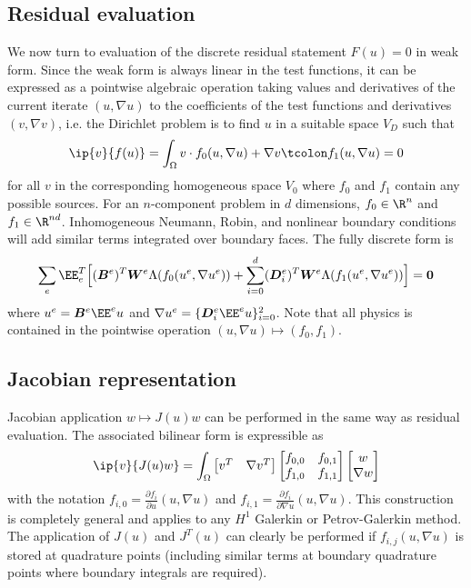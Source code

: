 \subsection{Residual evaluation}\label{sec:res-eval}
We now turn to evaluation of the discrete residual statement $F(u) = 0$ in weak form.  Since the weak form is always
linear in the test functions, it can be expressed as a pointwise algebraic operation taking values and derivatives of
the current iterate $(u,\nabla u)$ to the coefficients of the test functions and derivatives $(v,\nabla v)$, i.e. the
Dirichlet problem is to find $u$ in a suitable space $V_D$ such that
\begin{equation}\label{eq:feval}
  \ip{v}{f(u)} = \int_\Omega v \cdot f_0(u,\nabla u) + \nabla v \tcolon f_1(u,\nabla u) = 0
\end{equation}
for all $v$ in the corresponding homogeneous space $V_0$ where $f_0$ and $f_1$ contain any possible sources.  For an
$n$-component problem in $d$ dimensions, $f_0 \in \R^n$ and $f_1 \in \R^{nd}$.  Inhomogeneous Neumann, Robin, and
nonlinear boundary conditions will add similar terms integrated over boundary faces.  The fully discrete form is
\begin{equation}
  \label{eq:sum}
  \sum_e \EE_e^T \Big[ (\bm B^e)^T \bm W^e \Lambda(f_0(u^e,\nabla u^e))
  + \sum_{i=0}^d(\bm D_i^e)^T \bm W^e \Lambda(f_1(u^e,\nabla u^e)) \Big] = \bm 0
\end{equation}
where $u^e = \bm B^e \EE^e u$ and $\nabla u^e = \{\bm D_i^e \EE^e u\}_{i=0}^2$.  Note that all physics is contained in
the pointwise operation $(u,\nabla u) \mapsto (f_0,f_1)$.

\subsection{Jacobian representation}\label{sec:jac-rep}
Jacobian application $w \mapsto J(u) w$ can be performed in the same way as residual evaluation.  The associated
bilinear form is expressible as
\begin{equation}\label{eq:Jeval}
  \ip{v}{J(u) w} = \int_\Omega \begin{bmatrix} v^T & \nabla v^T \end{bmatrix}
  \begin{bmatrix} f_{0,0} & f_{0,1} \\ f_{1,0} & f_{1,1} \end{bmatrix} 
  \begin{bmatrix} w \\ \nabla w \end{bmatrix}
\end{equation}
with the notation $f_{i,0} = \frac{\partial f_i}{\partial u} (u,\nabla u)$ and $f_{i,1} = \frac{\partial f_i}{\partial
  \nabla u} (u,\nabla u)$.  This construction is completely general and applies to any $H^1$ Galerkin or Petrov-Galerkin
method.  The application of $J(u)$ and $J^T(u)$ can clearly be performed if $f_{i,j}(u,\nabla u)$ is stored at
quadrature points (including similar terms at boundary quadrature points where boundary integrals are required).

